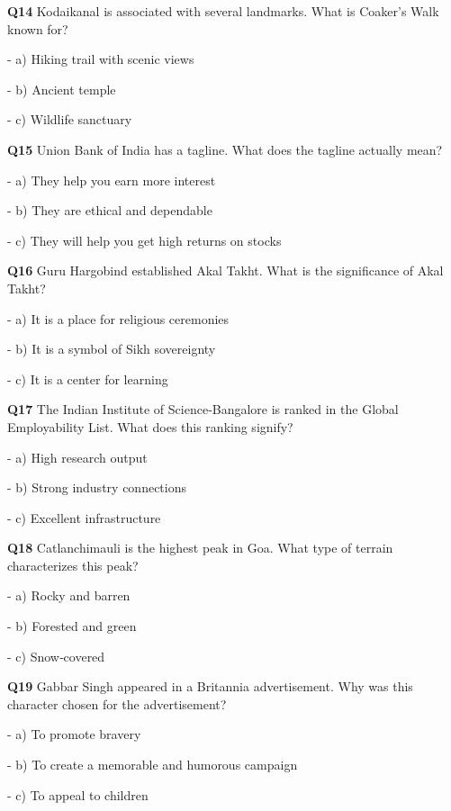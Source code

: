 \textbf{Q14} Kodaikanal is associated with several landmarks. What is Coaker's Walk known for?\par
\quad - a) Hiking trail with scenic views\par
\quad - b) Ancient temple\par
\quad - c) Wildlife sanctuary\par

\textbf{Q15} Union Bank of India has a tagline. What does the tagline actually mean?\par
\quad - a) They help you earn more interest\par
\quad - b) They are ethical and dependable\par
\quad - c) They will help you get high returns on stocks\par

\textbf{Q16} Guru Hargobind established Akal Takht. What is the significance of Akal Takht?\par
\quad - a) It is a place for religious ceremonies\par
\quad - b) It is a symbol of Sikh sovereignty\par
\quad - c) It is a center for learning\par

\textbf{Q17} The Indian Institute of Science‑Bangalore is ranked in the Global Employability List. What does this ranking signify?\par
\quad - a) High research output\par
\quad - b) Strong industry connections\par
\quad - c) Excellent infrastructure\par

\textbf{Q18} Catlanchimauli is the highest peak in Goa. What type of terrain characterizes this peak?\par
\quad - a) Rocky and barren\par
\quad - b) Forested and green\par
\quad - c) Snow‑covered\par

\textbf{Q19} Gabbar Singh appeared in a Britannia advertisement. Why was this character chosen for the advertisement?\par
\quad - a) To promote bravery\par
\quad - b) To create a memorable and humorous campaign\par
\quad - c) To appeal to children\par

